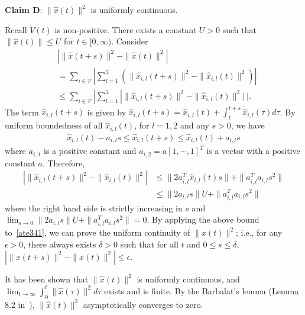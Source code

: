 \documentclass[journal]{IEEEtran}
\newcommand{\nnum}{\nonumber}
\newcommand{\VV}{{\mathcal{V}}}
\begin{document}
\textbf{Claim D}: $\|\hat{x}(t)\|^2$ is uniformly continuous.
\begin{IEEEproof}
Recall $\dot{V}(t)$ is non-positive. There exists a constant $U>0$ such that $\|\hat{x}(t)\| \leq U$ for $t \in [0,\infty)$. Consider
\begin{align}
&|\|\hat{{x}}(t+s)\|^2-\|\hat{{x}}(t)\|^2| \nnum\\
&= \sum_{i \in {\VV}}|\sum_{l=1}^3(\|\hat{x}_{i,l}(t+s)\|^2-\|\hat{x}_{i,l}(t)\|^2)|\nnum\\
&\leq  \sum_{i \in {\VV}}|\sum_{l=1}^3|\|\hat{x}_{i,l}(t+s)\|^2-\|\hat{x}_{i,l}(t)\|^2| \ |.
\label{ate341}
\end{align}
The term $\hat{x}_{i,l}(t+s)$ is given by $\hat{x}_{i,l}(t+s)  = \hat{x}_{i,l}(t) + \int_{t}^{t+s}\dot{\hat{x}}_{i,l}(\tau) d\tau$. By uniform boundedness of all $\hat{x}_{i,l}(t)$, for $l=1,2$ and any $s>0$, we have
\begin{align*}
\hat{x}_{i,l}(t) - a_{i,l} s \leq \hat{x}_{i,l}(t+s) \leq \hat{x}_{i,l}(t) + a_{i,l} s
\end{align*}
where $a_{i,1}$ is a positive constant and $a_{i,2}=a [1, \cdots, 1]^T$ is a vector with a positive constant $a$.
Therefore,
\begin{align*}
|\|\hat{x}_{i,l}(t+s)\|^2 -\|\hat{x}_{i,l}(t)\|^2| &\leq \|2 a_{i,l}^T \hat{x}_{i,l}(t) s\| + \| a_{i,l}^T a_{i,l} s^2\| \nnum\\
&\leq \|2 a_{i,l} s\|U + \| a_{i,l}^T a_{i,l} s^2\|
\end{align*}
where the right hand side is strictly increasing in $s$ and
$\lim_{s \rightarrow 0}\|2 a_{i,l} s\|U + \| a_{i,l}^T a_{i,l} s^2\| = 0$.
By applying the above bound to~\eqref{ate341}, we can prove the uniform continuity of $\|{x}(t)\|^2$; i.e., for any $\epsilon>0$, there always exists $\delta>0$ such that for all $t$ and $0 \leq s \leq \delta$, $|\|{x}(t+s)\|^2 -\|{x}(t)\|^2| \leq \epsilon$.
\end{IEEEproof}
It has been shown that $\|\hat{x}(t)\|^2$ is uniformly continuous, and 
$\lim_{t \rightarrow \infty}\int_{0}^{t}\|\hat{x}(\tau)\|^2d\tau$ exists and is finite. By the Barbalat's lemma (Lemma 8.2 in~\cite{Khalil:02}), $\|\hat{x}(t)\|^2$ asymptotically converges to zero.
\end{document}

